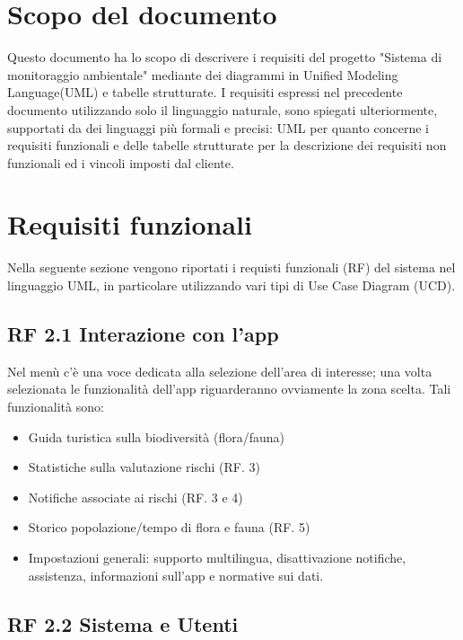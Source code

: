\section{Scopo del documento}
Questo documento ha lo scopo di descrivere i requisiti del progetto "Sistema di monitoraggio ambientale" mediante dei diagrammi in Unified Modeling Language(UML) e tabelle strutturate. I requisiti espressi nel precedente documento utilizzando solo il linguaggio naturale, sono spiegati ulteriormente, supportati da dei linguaggi più formali e precisi: UML per quanto concerne i requisiti funzionali e delle tabelle strutturate per la descrizione dei requisiti non funzionali ed i vincoli imposti dal cliente.

\section{Requisiti funzionali}
Nella seguente sezione vengono riportati i requisti funzionali (RF) del sistema nel linguaggio UML, in particolare utilizzando vari tipi di Use Case Diagram (UCD).

\subsection*{RF 2.1 Interazione con l'app}

Nel menù c’è una voce dedicata alla selezione dell’area di interesse; una volta selezionata le
funzionalità dell’app riguarderanno ovviamente la zona scelta. Tali funzionalità sono:
\begin{itemize}
    \item Guida turistica sulla biodiversità (flora/fauna)
    \item Statistiche sulla valutazione rischi (RF. 3)
    \item Notifiche associate ai rischi (RF. 3 e 4)
    \item Storico popolazione/tempo di flora e fauna (RF. 5)
    \item Impostazioni generali: supporto multilingua, disattivazione notifiche, assistenza, informazioni sull’app e normative sui dati.
\end{itemize}

\subsection*{RF 2.2 Sistema e Utenti}


